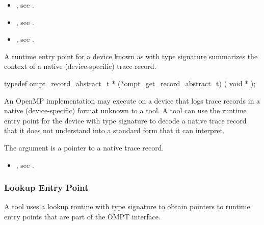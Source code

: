 \crossreferences
\begin{itemize}
\item {},
see .
\item {},
see .
\item {},
see .
\end{itemize}

\label{sec:ompt_get_record_abstract_t}

\summary
A runtime entry point for a device known as
with type signature
summarizes the context of a native (device-specific) trace record.

\format
\begin{ccppspecific}
\begin{omptOther}
typedef ompt_record_abstract_t *
(*ompt_get_record_abstract_t) (
  void *
);
\end{omptOther}
\end{ccppspecific}

\descr
An OpenMP implementation may execute on a device that logs
trace records in a native (device-specific) format unknown to a tool.
A tool can use the 
runtime entry point for the device with type signature
to decode a native trace record that it
does not understand into a standard form that it can interpret.

\argdesc

The argument  is a pointer to a native trace
record.

\crossreferences
\begin{itemize}
\item {},
see .
\end{itemize}

\subsubsection{Lookup Entry Point}

\label{sec:ompt_function_lookup_t}
\label{sec:ompt_function_lookup}

\summary
A tool uses a lookup routine with type signature
to obtain pointers to runtime entry points that are
part of the OMPT interface.

